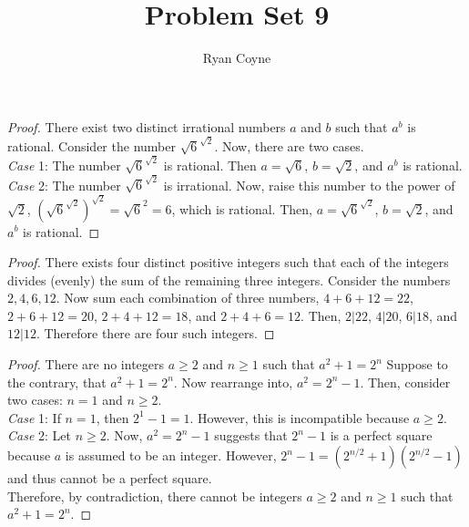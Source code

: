 \documentclass[12pt]{article}
\begin{document}
    \title{Problem Set 9}
    \author{Ryan Coyne}
    \maketitle

    \begin{proof}{There exist two distinct irrational numbers \(a\) and \(b\) such that \(a^b\) is rational.}
        Consider the number \(\sqrt{6}^{\sqrt{2}}\). Now, there are two cases.\\
        \textit{Case} 1: The number \(\sqrt{6}^{\sqrt{2}}\) is rational. Then \(a=\sqrt6\), \(b=\sqrt2\), and \(a^b\) is rational. \\
        \textit{Case} 2: The number \(\sqrt{6}^{\sqrt{2}}\) is irrational. Now, raise this number to the power of \(\sqrt2\), \((\sqrt{6}^{\sqrt{2}})^{\sqrt2}=\sqrt{6}^2=6\), which is rational. Then, \(a=\sqrt{6}^{\sqrt{2}}\), \(b=\sqrt2\), and \(a^b\) is rational. 
    \end{proof}
    \vspace{12pt}
    \begin{proof}{There exists four distinct positive integers such that each of the integers divides (evenly) the sum of the remaining three integers.}
            Consider the numbers \(2,4,6,12\). Now sum each combination of three numbers, \(4+6+12=22\), \(2+6+12=20\), \(2+4+12=18\), and \(2+4+6=12\). Then,  \(2|22\), \(4|20\), \(6|18\), and \(12|12\). Therefore there are four such integers.
    \end{proof}
    \vspace{12pt}    
    \begin{proof}{There are no integers \(a\geq2\) and \(n\geq1\) such that \(a^2+1=2^n\)}
        Suppose to the contrary, that \(a^2+1=2^n\). Now rearrange into, \(a^2 = 2^n-1\).
        Then, consider two cases: \(n=1\) and \(n\geq2\). \\ \textit{Case} 1: If \(n=1\), then \(2^1-1=1\). However, this is incompatible because \(a\geq2\). \\ \textit{Case} 2: Let \(n\geq2\). Now, \(a^2=2^n-1\) suggests that \(2^n-1\) is a perfect square because \(a\) is assumed to be an integer. However, \(2^n-1=(2^{n/2}+1)(2^{n/2}-1)\) and thus cannot be a perfect square.\\ Therefore, by contradiction, there cannot be integers \(a\geq2\) and \(n\geq1\) such that \(a^2+1=2^n\).
    \end{proof}
    \vspace{12pt}
\end{document}
